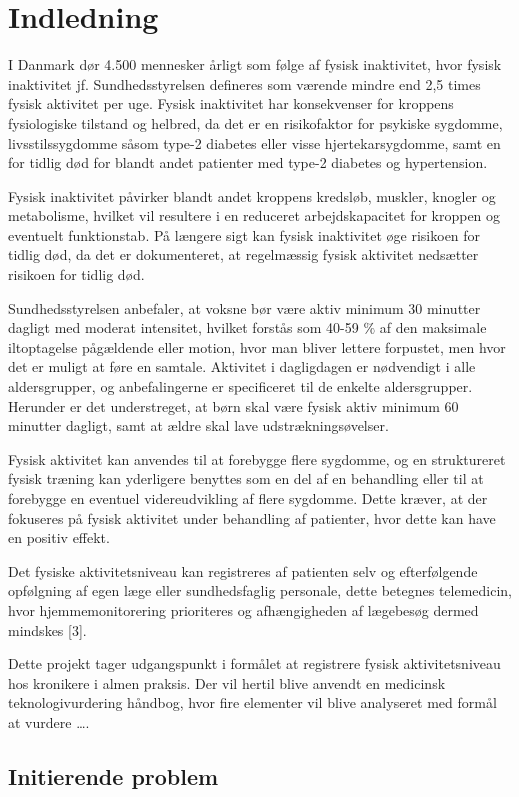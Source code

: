 \chapter{Indledning}
I Danmark dør 4.500 mennesker årligt som følge af fysisk inaktivitet, hvor fysisk inaktivitet jf. Sundhedsstyrelsen defineres som værende mindre end 2,5 times fysisk aktivitet per uge. \citep{aagaard2014} Fysisk inaktivitet har konsekvenser for kroppens fysiologiske tilstand og helbred, da det er en risikofaktor for psykiske sygdomme, livsstilssygdomme såsom type-2 diabetes eller visse hjertekarsygdomme, samt en for tidlig død for blandt andet patienter med type-2 diabetes og hypertension. \citep{motionsraad2007} 

Fysisk inaktivitet påvirker blandt andet kroppens kredsløb, muskler, knogler og metabolisme, hvilket vil resultere i en reduceret arbejdskapacitet for kroppen og eventuelt funktionstab. På længere sigt kan fysisk inaktivitet øge risikoen for tidlig død, da det er dokumenteret, at regelmæssig fysisk aktivitet nedsætter risikoen for tidlig død. \citep{motionsraad2007}

Sundhedsstyrelsen anbefaler, at voksne bør være aktiv minimum 30 minutter dagligt med moderat intensitet, hvilket forstås som 40-59 $\%$ af den maksimale iltoptagelse pågældende eller motion, hvor man bliver lettere forpustet, men hvor det er muligt at føre en samtale.
Aktivitet i dagligdagen er nødvendigt i alle aldersgrupper, og anbefalingerne er specificeret til de enkelte aldersgrupper. Herunder er det understreget, at børn skal være fysisk aktiv minimum 60 minutter dagligt, samt at ældre skal lave udstrækningsøvelser. \citep{pedersen2011}

Fysisk aktivitet kan anvendes til at forebygge flere sygdomme, og en struktureret fysisk træning kan yderligere benyttes som en del af en behandling eller til at forebygge en eventuel videreudvikling af flere sygdomme. \citep{motionsraad2007} Dette kræver, at der fokuseres på fysisk aktivitet under behandling af patienter, hvor dette kan have en positiv effekt. 

Det fysiske aktivitetsniveau kan registreres af patienten selv og efterfølgende opfølgning af egen læge eller sundhedsfaglig personale, dette betegnes telemedicin, hvor hjemmemonitorering prioriteres og afhængigheden af lægebesøg dermed mindskes [3].

Dette projekt tager udgangspunkt i formålet at registrere fysisk aktivitetsniveau hos kronikere i almen praksis. Der vil hertil blive anvendt en medicinsk teknologivurdering håndbog, hvor fire elementer vil blive analyseret med formål at vurdere …. 




\section{Initierende problem}